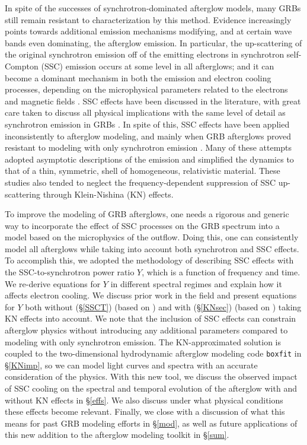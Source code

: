 \documentclass[fleqn,usenatbib]{mnras}
\begin{document}
In spite of the successes of synchrotron-dominated afterglow models, many GRBs still remain resistant to characterization by this method. Evidence increasingly points towards additional emission mechanisms modifying, and at certain wave bands even dominating, the afterglow emission. In particular, the up-scattering of the original synchrotron emission off of the emitting electrons in synchrotron self-Compton (SSC) emission  occurs at some level in all afterglows; and it can become a dominant mechanism in both the emission and electron cooling processes, depending on the microphysical parameters related to the electrons and magnetic fields \citep[e.g.][]{lemoine13}. SSC effects have been discussed in the literature, with great care taken to discuss all physical implications with the same level of detail as synchrotron emission in GRBs \citep[e.g.][]{se01,Nakar,Nava,lemoine15,beniamini}. In spite of this, SSC effects have been applied inconsistently to afterglow modeling, and mainly when GRB afterglows proved resistant to modeling with only synchrotron emission \citep[e.g.][]{CH1}. Many of these attempts adopted asymptotic descriptions of the emission and simplified the dynamics to that of a thin, symmetric, shell of homogeneous, relativistic material. These studies also tended to neglect the frequency-dependent suppression of SSC up-scattering through Klein-Nishina (KN) effects.

To improve the modeling of GRB afterglows, one needs a rigorous and generic way to incorporate the effect of SSC processes on the GRB spectrum into a model based on the microphysics of the outflow. Doing this, one can consistently model all afterglows while taking into account both synchrotron and SSC effects. To accomplish this, we adopted the methodology of describing SSC effects with the SSC-to-synchrotron power ratio $Y$, which is a function of frequency and time. We re-derive equations for $Y$ in different spectral regimes and explain how it affects electron cooling. We discuss prior work in the field and present equations for $Y$ both without (\S \ref{SSCT}) (based on \citet{se01}) and with (\S \ref{KNsec}) (based on \citet{Nakar}) taking KN effects into account. We note that the inclusion of SSC effects can constrain afterglow physics without introducing any additional parameters compared to modeling with only synchrotron emission. The KN-approximated solution is coupled to the two-dimensional hydrodynamic afterglow modeling code \texttt{boxfit} \citep{vetajvdh} in \S \ref{KNimp}, so we can model light curves and spectra with an accurate consideration of the physics. With this new tool, we discuss the observed impact of SSC cooling on the spectral and temporal evolution of the afterglow with and without KN effects in \S \ref{effs}. We also discuss under what physical conditions these effects become relevant. Finally, we close with a discussion of what this means for past GRB modeling efforts in \S \ref{mod}, as well as future applications of this new addition to the afterglow modeling toolkit in \S \ref{sum}.
\end{document}
